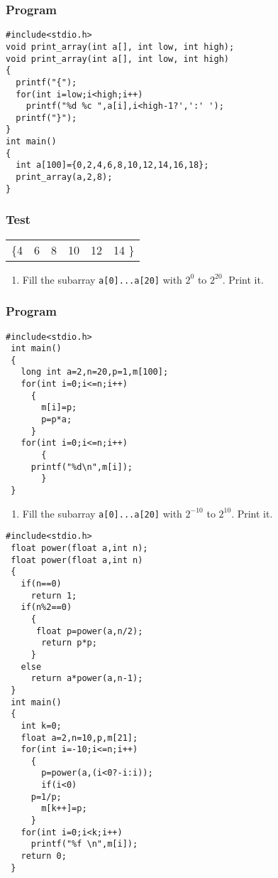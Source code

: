 \documentclass[11pt]{article}
\begin{document}
\subsubsection*{Program}
\label{sec-1-5-3}
\begin{verbatim}
#include<stdio.h>
void print_array(int a[], int low, int high);
void print_array(int a[], int low, int high)
{
  printf("{");
  for(int i=low;i<high;i++)
    printf("%d %c ",a[i],i<high-1?',':' ');
  printf("}");
}
int main()
{
  int a[100]={0,2,4,6,8,10,12,14,16,18};
  print_array(a,2,8);
}
\end{verbatim}
\subsubsection*{Test}
\label{sec-1-5-4}
\begin{center}
\begin{tabular}{lrrrrl}
\{4 & 6 & 8 & 10 & 12 & 14   \}\\
\end{tabular}
\end{center}

\begin{enumerate}
\item Fill the subarray \texttt{a[0]...a[20]} with $2^0$ to $2^{20}$. Print
it.
\end{enumerate}
\subsubsection*{Program}
\label{sec-1-5-5}
\begin{verbatim}
#include<stdio.h>
 int main()
 {
   long int a=2,n=20,p=1,m[100];
   for(int i=0;i<=n;i++)
     {
       m[i]=p;
       p=p*a;
     }
   for(int i=0;i<=n;i++)
       {
	 printf("%d\n",m[i]);
       }
 }
\end{verbatim}

\begin{enumerate}
\item Fill the subarray \texttt{a[0]...a[20]} with $2^{-10}$ to
$2^{10}$. Print it.
\end{enumerate}
\begin{verbatim}
#include<stdio.h>
 float power(float a,int n);
 float power(float a,int n)
 {
   if(n==0)
     return 1;
   if(n%2==0)
     {
      float p=power(a,n/2);
       return p*p;
     }
   else
     return a*power(a,n-1);
 }
 int main()
 {
   int k=0;
   float a=2,n=10,p,m[21];
   for(int i=-10;i<=n;i++)
     {
       p=power(a,(i<0?-i:i));
       if(i<0)
	 p=1/p;
       m[k++]=p;
     }
   for(int i=0;i<k;i++)
     printf("%f \n",m[i]);
   return 0;
 }
\end{verbatim}
\end{document}
